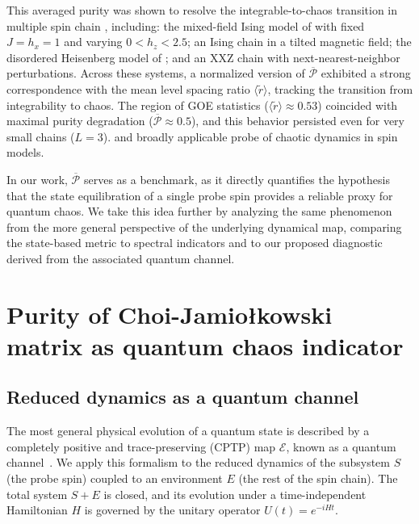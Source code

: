 \documentclass[letterpaper,superscriptaddress,aps,pra,nolongbibliography,showpacs,floatfix,dvipsnames,10pt,twocolumn]{revtex4-2}
\newcommand{\jami}{Choi-Jamiołkowski}
\begin{document}
This averaged purity was shown to resolve the
integrable-to-chaos transition in multiple spin chain , including:
the mixed-field Ising model of  with fixed $J=h_x=1$
and varying $0<h_z<2.5$; an Ising 
chain in a tilted magnetic field; the disordered Heisenberg model of ; 
and an XXZ chain with next-nearest-neighbor perturbations. 
Across these systems, a normalized version of $\overline{\mathcal{P}}$
exhibited a strong correspondence with the mean level spacing 
ratio $\langle\tilde r\rangle$, tracking the transition from 
integrability to chaos. 
The region of GOE statistics ($\langle\tilde r\rangle\approx0.53$)
coincided with maximal purity degradation ($\overline{\mathcal{P}}\approx0.5$),
and this behavior persisted even for very small chains ($L=3$).
and broadly applicable probe of chaotic dynamics in spin models.

In our work, $\overline{\mathcal{P}}$ serves as a benchmark, as it
directly quantifies the hypothesis that the state equilibration of a
single probe spin provides a reliable proxy for quantum chaos.
We take this idea further by analyzing the same phenomenon from the more
general perspective of the underlying dynamical map, comparing the
state-based metric to spectral indicators and to our proposed diagnostic
derived from the associated quantum channel.



\section{Purity of \jami{} matrix as quantum chaos indicator}\label{sec:choi_matrix}
\subsection{Reduced dynamics as a quantum channel}\label{sec:reduced_dynamics}
The most general physical evolution of a quantum state is described 
by a completely
positive and trace-preserving (CPTP) map $\mathcal{E}$, known as a quantum
channel~\cite{nielsen_2010_quantum,bengtsson_2006_geometry}. We apply this
formalism to the reduced dynamics of the subsystem $S$ (the probe spin)
coupled to an environment $E$ (the rest of the spin chain). The total
system $S+E$ is closed, and its evolution under a time-independent
Hamiltonian $H$ is governed by the unitary operator $U(t) = e^{-iHt}$.
\end{document}
